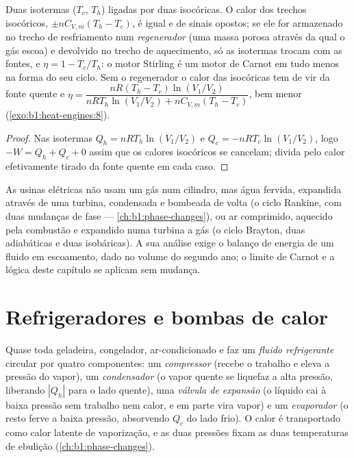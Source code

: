 \begin{proposition}\label{prop:b1:heat-engines:stirling}
Duas isotermas ($T_c$, $T_h$) ligadas por duas isocóricas. O calor dos
trechos isocóricos, $\pm nC_{V,m}(T_h - T_c)$, é igual e de sinais opostos; se ele
for armazenado no trecho de resfriamento num \emph{regenerador} (uma massa
porosa através da qual o gás escoa) e devolvido no trecho de aquecimento, só
as isotermas trocam com as fontes, e $\eta = 1 - T_c/T_h$: o motor Stirling
é um motor de Carnot em tudo menos na forma do seu ciclo. Sem o
regenerador o calor das isocóricas tem de vir da fonte quente e
$\eta = \dfrac{nR(T_h - T_c)\ln(V_1/V_2)}{nRT_h\ln(V_1/V_2) + nC_{V,m}(T_h - T_c)}$,
bem menor (\cref{exo:b1:heat-engines:8}).
\end{proposition}

\begin{proof}
Nas isotermas $Q_h = nRT_h\ln(V_1/V_2)$ e $Q_c = -nRT_c\ln(V_1/V_2)$, logo
$-W = Q_h + Q_c + 0$ assim que os calores isocóricos se cancelam; divida pelo calor
efetivamente tirado da fonte quente em cada caso.
\end{proof}

\begin{remark}\label{rem:b1:heat-engines:turbines}
As usinas elétricas não usam um gás num cilindro, mas água fervida,
expandida através de uma turbina, condensada e bombeada de volta (o ciclo
Rankine, com duas mudanças de fase --- \cref{ch:b1:phase-changes}), ou ar
comprimido, aquecido pela combustão e expandido numa turbina a gás (o ciclo
Brayton, duas adiabáticas e duas isobáricas). A sua análise exige o balanço
de energia de um fluido em escoamento, dado no volume do segundo ano; o
limite de Carnot e a lógica deste capítulo se aplicam sem mudança.
\end{remark}

\section{Refrigeradores e bombas de calor}

\begin{definition}\label{def:b1:heat-engines:vapourcycle}
Quase toda geladeira, congelador, ar-condicionado e  faz um
\emph{fluido refrigerante} circular por quatro componentes: um \emph{compressor}
(recebe o trabalho e eleva a pressão do vapor), um
\emph{condensador} (o vapor quente se liquefaz a alta pressão, liberando
$|Q_h|$ para o lado quente), uma \emph{válvula de expansão} (o líquido cai à
baixa pressão sem trabalho nem calor, e em parte vira vapor) e um
\emph{evaporador} (o resto ferve a baixa pressão, absorvendo $Q_c$ do
lado frio). O calor é transportado como calor latente de vaporização, e
as duas pressões fixam as duas temperaturas de ebulição
(\cref{ch:b1:phase-changes}).
\end{definition}


